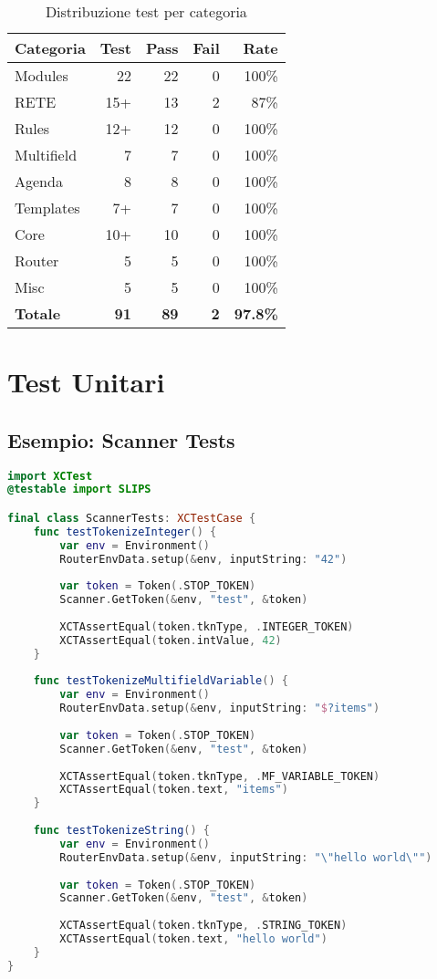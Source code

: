 \begin{table}[h]
\centering
\begin{tabular}{@{}lrrrr@{}}
\toprule
\textbf{Categoria} & \textbf{Test} & \textbf{Pass} & \textbf{Fail} & \textbf{Rate} \\
\midrule
Modules & 22 & 22 & 0 & 100\% \\
RETE & 15+ & 13 & 2 & 87\% \\
Rules & 12+ & 12 & 0 & 100\% \\
Multifield & 7 & 7 & 0 & 100\% \\
Agenda & 8 & 8 & 0 & 100\% \\
Templates & 7+ & 7 & 0 & 100\% \\
Core & 10+ & 10 & 0 & 100\% \\
Router & 5 & 5 & 0 & 100\% \\
Misc & 5 & 5 & 0 & 100\% \\
\midrule
\textbf{Totale} & \textbf{91} & \textbf{89} & \textbf{2} & \textbf{97.8\%} \\
\bottomrule
\end{tabular}
\caption{Distribuzione test per categoria}
\label{tab:test_distribution}
\end{table}

\section{Test Unitari}

\subsection{Esempio: Scanner Tests}

\begin{lstlisting}[language=Swift]
import XCTest
@testable import SLIPS

final class ScannerTests: XCTestCase {
    func testTokenizeInteger() {
        var env = Environment()
        RouterEnvData.setup(&env, inputString: "42")
        
        var token = Token(.STOP_TOKEN)
        Scanner.GetToken(&env, "test", &token)
        
        XCTAssertEqual(token.tknType, .INTEGER_TOKEN)
        XCTAssertEqual(token.intValue, 42)
    }
    
    func testTokenizeMultifieldVariable() {
        var env = Environment()
        RouterEnvData.setup(&env, inputString: "$?items")
        
        var token = Token(.STOP_TOKEN)
        Scanner.GetToken(&env, "test", &token)
        
        XCTAssertEqual(token.tknType, .MF_VARIABLE_TOKEN)
        XCTAssertEqual(token.text, "items")
    }
    
    func testTokenizeString() {
        var env = Environment()
        RouterEnvData.setup(&env, inputString: "\"hello world\"")
        
        var token = Token(.STOP_TOKEN)
        Scanner.GetToken(&env, "test", &token)
        
        XCTAssertEqual(token.tknType, .STRING_TOKEN)
        XCTAssertEqual(token.text, "hello world")
    }
}
\end{lstlisting}

